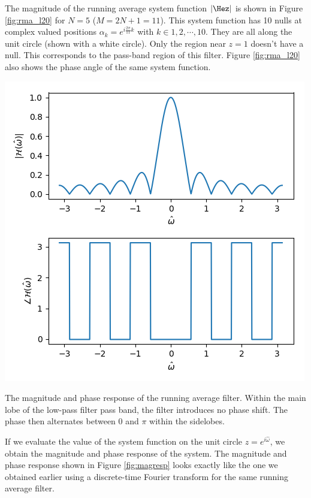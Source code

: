 The magnitude of the running average system function $|\Hez|$ is shown
in Figure \ref{fig:rma_l20} for $N=5$ ($M=2N+1 = 11$). This system
function has 10 nulls at complex valued positions
$\alpha_k=e^{i\frac{2\pi}{11}k}$ with $k\in {1,2,\cdots,10}$. They are
all along the unit circle (shown with a white circle). Only the region
near $z=1$ doesn't have a null. This corresponds to the pass-band
region of this filter. Figure \ref{fig:rma_l20} also shows the phase
angle of the same system function.
\begin{marginfigure}[5cm]
\begin{center}
\includegraphics[width=\textwidth]{code/025_system_function/rma_magresp.png}
\end{center}
\caption{The magnitude and phase response of the running average
  filter. Within the main lobe of the low-pass filter pass band, the
  filter introduces no phase shift. The phase then alternates between
  0 and $\pi$ within the sidelobes.}
\label{fig:magresp}
\end{marginfigure}

If we evaluate the value of the system function on the unit circle
$z=e^{i\hat{\omega}}$, we obtain the magnitude and phase response of
the system. The magnitude and phase response shown in Figure
\ref{fig:magresp} looks exactly like the one we obtained earlier using
a discrete-time Fourier transform for the same running average filter.



